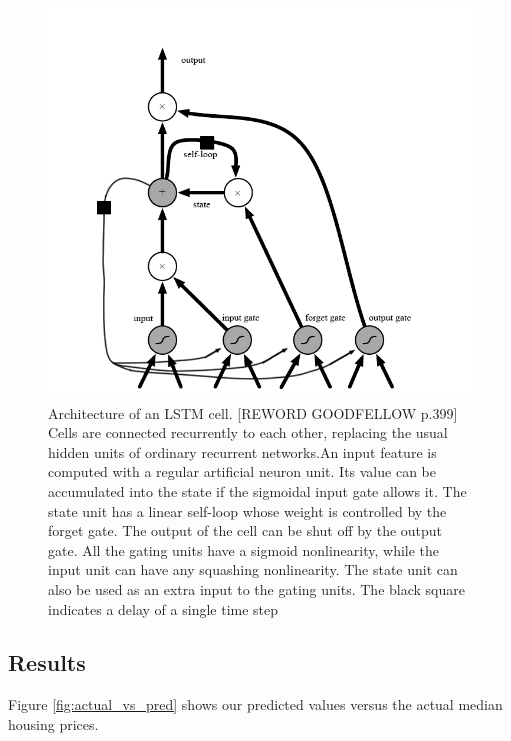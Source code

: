\documentclass [MS] {uclathes}
\begin{document}
\begin{figure}[h!]
    \centering
    \includegraphics[scale=0.5]{figures/lstm_architecture2.png}
    \caption{Architecture of an LSTM cell\cite{GoodBengCour16}. [REWORD GOODFELLOW p.399] Cells are connected recurrently to each other, replacing the usual hidden units of ordinary recurrent networks.An input feature is computed with a regular artiﬁcial neuron unit. Its value can be accumulated into the state if the sigmoidal input gate allows it. The state unit has a linear self-loop whose weight is controlled by the forget gate. The output of the cell can be shut oﬀ by the output gate. All the gating units have a sigmoid nonlinearity, while the input unit can have any squashing nonlinearity. The state unit can also be used as an extra input to the gating units. The black square indicates a delay of a single time step}
    \label{fig:lstm_architecture2}
\end{figure}

\subsection{Results}

Figure \ref{fig:actual_vs_pred} shows our predicted values versus the actual median housing prices.
\end{document}
